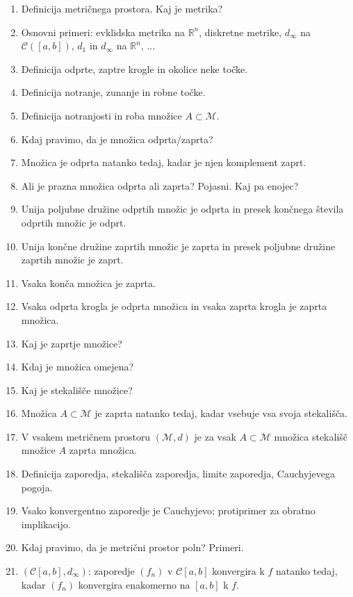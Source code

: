 \documentclass[a4paper,12pt]{report}
\begin{document}
\begin{enumerate}
    \item Definicija metričnega prostora. Kaj je metrika?
    \item Osnovni primeri: evklidska metrika na $\mathbb{R}^n$, diskretne metrike, $d_{\infty}$ na $\mathcal{C}([a, b])$, $d_1$ in $d_{\infty}$ na $\mathbb{R}^n$, ...
    \item Definicija odprte, zaptre krogle in okolice neke točke.
    \item Definicija notranje, zunanje in robne točke.
    \item Definicija notranjosti in roba množice $A \subset \mathcal{M}$.
    \item Kdaj pravimo, da je množica odprta/zaprta?
    \item Množica je odprta natanko tedaj, kadar je njen komplement zaprt.
    \item Ali je prazna množica odprta ali zaprta? Pojasni. Kaj pa enojec?
    \item Unija poljubne družine odprtih množic je odprta in presek končnega števila odprtih množic je odprt.
    \item Unija končne družine zaprtih množic je zaprta in presek poljubne družine zaprtih množic je zaprt.
    \item Vsaka konča množica je zaprta.
    \item Vsaka odprta krogla je odprta množica in vsaka zaprta krogla je zaprta množica.
    \item Kaj je zaprtje množice?
    \item Kdaj je množica omejena?
    \item Kaj je stekališče množice?
    \item Množica $A \subset \mathcal{M}$ je zaprta natanko tedaj, kadar vsebuje vsa svoja stekališča.
    \item V vsakem metričnem prostoru $(\mathcal{M}, d)$ je za vsak $A \subset \mathcal{M}$ množica stekališč množice $A$ zaprta množica.
    \item Definicija zaporedja, stekališča zaporedja, limite zaporedja, Cauchyjevega pogoja.
    \item Vsako konvergentno zaporedje je Cauchyjevo; protiprimer za obratno implikacijo.
    \item Kdaj pravimo, da je metrični prostor poln? Primeri.
    \item $(\mathcal{C}[a, b], d_{\infty})$: zaporedje $(f_n)$ v $\mathcal{C}[a, b]$ konvergira k $f$ natanko tedaj, kadar $(f_n)$ konvergira enakomerno na $[a, b]$ k $f$.

\end{enumerate}
\end{document}
